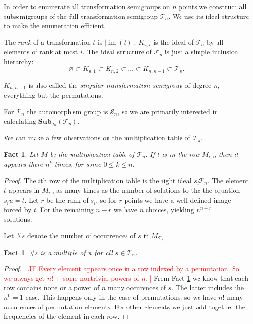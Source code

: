 \documentclass{amsart}
\newcommand{\cT}{{\mathcal T}}
\newcommand{\cS}{{\mathcal S}}
\newcommand{\Sub}{\mathbf{Sub}}
\DeclareMathOperator{\im}{im}
\newcommand{\todo}[1]{\textcolor{red}{ \small \textsf{[ #1 ]} \normalsize}}
\theoremstyle{plain}
\newtheorem{fact}[theorem]{Fact}
\theoremstyle{definition}
\begin{document}
In order to enumerate all transformation semigroups on $n$ points we construct all subsemigroups of the full transformation semigroup $\cT_n$. We use its ideal structure to make the enumeration efficient.

The \emph{rank} of a transformation $t$ is $|\im(t)|$. 
$K_{n,i}$ is the ideal of $\cT_n$ by all elements of rank at most $i$.
The ideal structure of $\cT_n$ is just a simple inclusion hierarchy:
$$\varnothing\subset K_{n,1}\subset K_{n,2}\subset\ldots\subset K_{n,n-1}\subset \cT_n.$$

$K_{n,n-1}$ is also called the \emph{singular transformation semigroup} of degree $n$, everything but the permutations.

 For $\cT_n$ the automorphism group is $\cS_n$, so we are primarily interested in calculating $\Sub_{\cS_n}(\cT_n)$.

We can make a few observations on the multiplication table of $\cT_n$.
\begin{fact}
\label{fact:npower}
Let $M$ be the multiplication table of $\cT_n$.
If $t$ is in the row $M_{i,\square}$, then it appears there $n^k$ times, for some $0\leq k\leq n$.
\end{fact}
\begin{proof}
The $i$th row of the multiplication table is the right  ideal $s_i\cT_n$.
The element $t$ appears in $M_{i,\square}$ as many times as the number of solutions to the the equation $s_iu=t$.
Let $r$ be the rank of $s_i$, so for $r$ points we have a well-defined image forced by $t$.
For the remaining $n-r$ we have $n$ choices, yielding $n^{n-r}$ solutions. 
\end{proof}

Let $\#s$ denote the number of occurrences of $s$ in $M_{\cT_n}$.
\begin{fact}
$\#s$ is a multiple of $n$ for all $s\in\cT_n$.
\end{fact}
\begin{proof}
\todo{JE Every element appears once in a row indexed by a permutation. So we always get $n!$ + some nontrivial powers of $n$.}
From Fact \ref{fact:npower} we know that each row contains none or a power of $n$ many occurences of $s$.
The latter includes the $n^0=1$ case.
This happens only in the case of permutations, so we have $n!$ many occurences of permutation elements.
For other elements we just add together the frequencies of the element in each row.
\end{proof}
\end{document}
